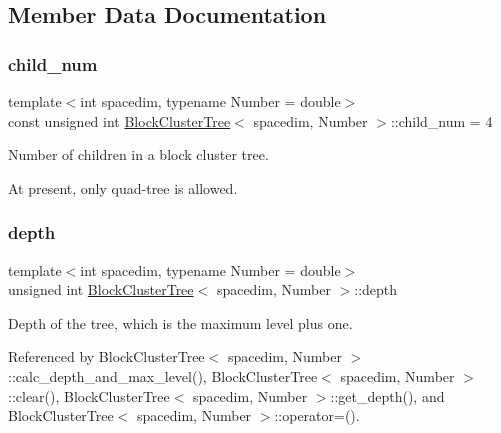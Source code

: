 \subsection{Member Data Documentation}
\mbox{\label{classBlockClusterTree_a000c439b578bcf4fa28b7f3edd6079e9}} 
\subsubsection{\texorpdfstring{child\+\_\+num}{child\_num}}
{\footnotesize\ttfamily template$<$int spacedim, typename Number = double$>$ \\
const unsigned int \hyperlink{classBlockClusterTree}{Block\+Cluster\+Tree}$<$ spacedim, Number $>$\+::child\+\_\+num = 4\hspace{0.3cm}{\ttfamily [static]}}

Number of children in a block cluster tree.

At present, only quad-\/tree is allowed. \mbox{\label{classBlockClusterTree_a77349ec9ccb36d45af3f176a93516897}} 
\subsubsection{\texorpdfstring{depth}{depth}}
{\footnotesize\ttfamily template$<$int spacedim, typename Number = double$>$ \\
unsigned int \hyperlink{classBlockClusterTree}{Block\+Cluster\+Tree}$<$ spacedim, Number $>$\+::depth\hspace{0.3cm}{\ttfamily [private]}}

Depth of the tree, which is the maximum level plus one. 

Referenced by Block\+Cluster\+Tree$<$ spacedim, Number $>$\+::calc\+\_\+depth\+\_\+and\+\_\+max\+\_\+level(), Block\+Cluster\+Tree$<$ spacedim, Number $>$\+::clear(), Block\+Cluster\+Tree$<$ spacedim, Number $>$\+::get\+\_\+depth(), and Block\+Cluster\+Tree$<$ spacedim, Number $>$\+::operator=().

\mbox{\label{classBlockClusterTree_a8dc01af98989bb71246fa2cd4d7307da}} 
